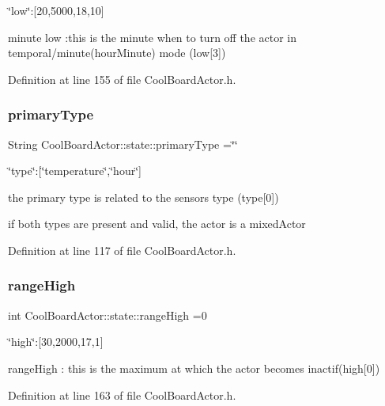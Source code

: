 \char`\"{}low\char`\"{}\+:\mbox{[}20,5000,18,10\mbox{]}

minute low \+:this is the minute when to turn off the actor in temporal/minute(hour\+Minute) mode (low\mbox{[}3\mbox{]}) 

Definition at line 155 of file Cool\+Board\+Actor.\+h.

\mbox{\label{struct_cool_board_actor_1_1state_a8a0b318fd2814cf67fe74ee8164df55e}} 
\subsubsection{\texorpdfstring{primary\+Type}{primaryType}}
{\footnotesize\ttfamily String Cool\+Board\+Actor\+::state\+::primary\+Type =\char`\"{}\char`\"{}}

\char`\"{}type\char`\"{}\+:\mbox{[}\char`\"{}temperature\char`\"{},\char`\"{}hour\char`\"{}\mbox{]}

the primary type is related to the sensor\textquotesingle{}s type (type\mbox{[}0\mbox{]})

if both types are present and valid, the actor is a mixed\+Actor 

Definition at line 117 of file Cool\+Board\+Actor.\+h.

\mbox{\label{struct_cool_board_actor_1_1state_a6e5cd6c5cd44e2decfd8d4df1853f8e3}} 
\subsubsection{\texorpdfstring{range\+High}{rangeHigh}}
{\footnotesize\ttfamily int Cool\+Board\+Actor\+::state\+::range\+High =0}

\char`\"{}high\char`\"{}\+:\mbox{[}30,2000,17,1\mbox{]}

range\+High \+: this is the maximum at which the actor becomes inactif(high\mbox{[}0\mbox{]}) 

Definition at line 163 of file Cool\+Board\+Actor.\+h.

\mbox{\label{struct_cool_board_actor_1_1state_a43f891c9fb3bb63575c27cec860de55a}} 

